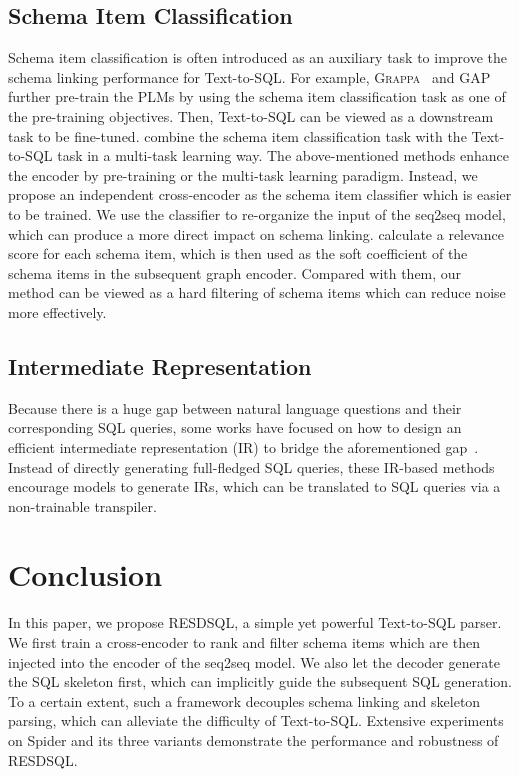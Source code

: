 \documentclass[letterpaper]{article} \usepackage{aaai23}  \usepackage{times}  \usepackage{helvet}  \usepackage{courier}  \usepackage[hyphens]{url}  \usepackage{graphicx} \urlstyle{rm} \def\UrlFont{\rm}  \usepackage{natbib}  \usepackage{caption} \frenchspacing  \setlength{\pdfpagewidth}{8.5in}  \setlength{\pdfpageheight}{11in}  \usepackage{algorithm}
\newcommand{\model}{RESDSQL}
\begin{document}
\subsection{Schema Item Classification}
Schema item classification is often introduced as an auxiliary task to improve the schema linking performance for Text-to-SQL. For example, \textsc{Grappa}~\citep{tao2021grappa} and GAP~\citep{peng2021learning} further pre-train the PLMs by using the schema item classification task as one of the pre-training objectives. Then, Text-to-SQL can be viewed as a downstream task to be fine-tuned. \citet{ruisheng2021lgesql} combine the schema item classification task with the Text-to-SQL task in a multi-task learning way.
The above-mentioned methods enhance the encoder by pre-training or the multi-task learning paradigm. Instead, we propose an independent cross-encoder as the schema item classifier which is easier to be trained. We use the classifier to re-organize the input of the seq2seq model, which can produce a more direct impact on schema linking. \citet{ben2019global} calculate a relevance score for each schema item, which is then used as the soft coefficient of the schema items in the subsequent graph encoder. Compared with them, our method can be viewed as a hard filtering of schema items which can reduce noise more effectively.

\subsection{Intermediate Representation}
Because there is a huge gap between natural language questions and their corresponding SQL queries, some works have focused on how to design an efficient intermediate representation (IR) to bridge the aforementioned gap~\citep{tao2018syntaxsqlnet, jiaqi2019towards, yujian2021naturalsql}. Instead of directly generating full-fledged SQL queries, these IR-based methods encourage models to generate IRs, which can be translated to SQL queries via a non-trainable transpiler.

\section{Conclusion}
In this paper, we propose \model, a simple yet powerful Text-to-SQL parser. 
We first train a cross-encoder to rank and filter schema items which are then injected into the encoder of the seq2seq model. We also let the decoder generate the SQL skeleton first, which can implicitly guide the subsequent SQL generation. To a certain extent, such a framework decouples schema linking and skeleton parsing, which can alleviate the difficulty of Text-to-SQL.
Extensive experiments on Spider and its three variants demonstrate the performance and robustness of \model.
\end{document}
